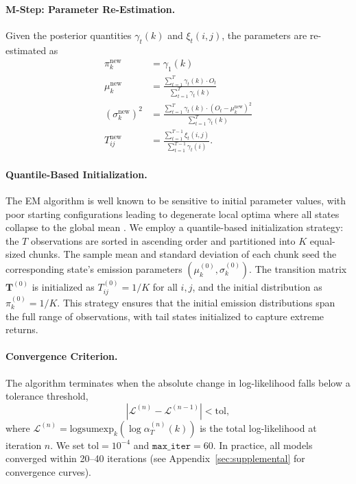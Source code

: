 \paragraph{M-Step: Parameter Re-Estimation.}
Given the posterior quantities $\gamma_t(k)$ and $\xi_t(i,j)$, the parameters are re-estimated as
\begin{align}
    \pi_k^{\text{new}} &= \gamma_1(k) \label{eq:pi_update} \\[4pt]
    \mu_k^{\text{new}} &= \frac{\displaystyle\sum_{t=1}^{T} \gamma_t(k) \cdot O_t}{\displaystyle\sum_{t=1}^{T} \gamma_t(k)} \label{eq:mu_update} \\[4pt]
    \left(\sigma_k^{\text{new}}\right)^2 &= \frac{\displaystyle\sum_{t=1}^{T} \gamma_t(k) \cdot (O_t - \mu_k^{\text{new}})^2}{\displaystyle\sum_{t=1}^{T} \gamma_t(k)} \label{eq:sigma_update} \\[4pt]
    T_{ij}^{\text{new}} &= \frac{\displaystyle\sum_{t=1}^{T-1} \xi_t(i,j)}{\displaystyle\sum_{t=1}^{T-1} \gamma_t(i)}. \label{eq:T_update}
\end{align}

\paragraph{Quantile-Based Initialization.}
The EM algorithm is well known to be sensitive to initial parameter values, with poor starting configurations leading to degenerate local optima where all states collapse to the global mean \cite{rabiner1986introduction}.
We employ a quantile-based initialization strategy: the $T$ observations are sorted in ascending order and partitioned into $K$ equal-sized chunks.
The sample mean and standard deviation of each chunk seed the corresponding state's emission parameters $(\mu_k^{(0)}, \sigma_k^{(0)})$.
The transition matrix $\mathbf{T}^{(0)}$ is initialized as $T_{ij}^{(0)} = 1/K$ for all $i, j$, and the initial distribution as $\pi_k^{(0)} = 1/K$.
This strategy ensures that the initial emission distributions span the full range of observations, with tail states initialized to capture extreme returns.

\paragraph{Convergence Criterion.}
The algorithm terminates when the absolute change in log-likelihood falls below a tolerance threshold,
\begin{equation}
    |\mathcal{L}^{(n)} - \mathcal{L}^{(n-1)}| < \text{tol},
    \label{eq:convergence}
\end{equation}
where $\mathcal{L}^{(n)} = \text{logsumexp}_{k}(\log \alpha_T^{(n)}(k))$ is the total log-likelihood at iteration $n$.
We set $\text{tol} = 10^{-4}$ and $\texttt{max\_iter} = 60$.
In practice, all models converged within 20--40 iterations (see Appendix~\ref{sec:supplemental} for convergence curves).

